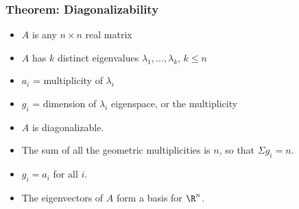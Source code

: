 \begin{frame}
\frametitle{Theorem: Diagonalizability}


    \begin{itemize}
        \item<2-> $A$ is any $n\times n$ real matrix
        \item<3-> $A$ has $k$ distinct eigenvalues $\lambda_1, \ldots , \lambda_k$, $k \le n$
        \item<4-> $a_i$ =  multiplicity of $\lambda_i$
        \item<5-> $g_i$ = dimension of $\lambda_i$ eigenspace, or the  multiplicity
    \end{itemize}
    \begin{itemize}
        \item<7-> $A$ is diagonalizable.  
        \item<8-> The sum of all the geometric multiplicities is $n$, so that $\Sigma g_i = n$.
        \item<9-> $g_i = a_i$ for all $i$.
        \item<10-> The eigenvectors of $A$ form a basis for $\R^n$. 
    \end{itemize}
\end{frame}


